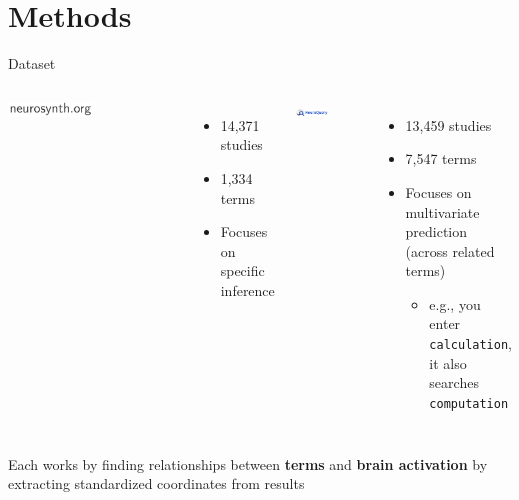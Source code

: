 \documentclass[aspectratio=169]{beamer}
\newcommand\blfootnote[1]{%
	\begingroup
	\renewcommand\thefootnote{}\footnote{#1}%
	\addtocounter{footnote}{-1}%
	\endgroup
}
\begin{document}







\section{Methods}

\begin{frame}{Dataset}
	
	\begin{columns}[t]
		\includegraphics[width=0.5\textwidth]{neurosynth}\cite{YarkoniEtAl2011}
		
		\begin{itemize}
			\item 14,371 studies
			\item 1,334 terms
			\item Focuses on specific inference
		\end{itemize}
		
		\includegraphics[width=0.5\textwidth]{neuroquery}\cite{DockesEtAl2020}
		
		\begin{itemize}
			\item 13,459 studies
			\item 7,547 terms
			\item Focuses on multivariate prediction (across related terms)
			\begin{itemize}
				\item e.g., you enter \texttt{calculation}, it also searches \texttt{computation}
			\end{itemize}
		\end{itemize}
	\end{columns}
	
	\begin{block}{}
		Each works by finding relationships between \textbf{terms} and \textbf{brain activation} by extracting standardized coordinates from results
	\end{block}
\end{frame}
\end{document}
